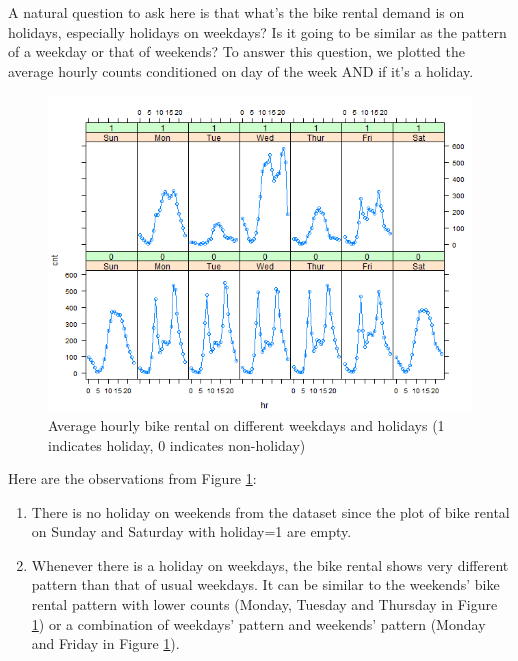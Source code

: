 \documentclass[12pt]{article}
\begin{document}
	A natural question to ask here is that what's the bike rental demand is on holidays, especially holidays on weekdays?  Is it going to be similar as the pattern of a weekday or that of weekends? To answer this question, we plotted the average hourly counts conditioned on day of the week AND if it's a holiday.
		\begin{figure}[H]
			\centering
			\includegraphics[scale=.5]{figures/hr_weekday_holiday.png}
			\caption{Average hourly bike rental on different weekdays and holidays (1 indicates holiday, 0 indicates non-holiday)} 
			\label{fig:weekday_holiday}
		\end{figure}
		
	Here are the observations from Figure \ref{fig:weekday_holiday}:
	\begin{enumerate}
		\item There is no holiday on weekends from the dataset since the plot of bike rental on Sunday and Saturday with holiday=1 are empty.
		\item Whenever there is a holiday on weekdays, the bike rental shows very different pattern than that of usual weekdays. It can be similar to the weekends' bike rental pattern with lower counts (Monday, Tuesday and Thursday in Figure \ref{fig:weekday_holiday}) or a combination of weekdays' pattern and weekends' pattern (Monday and Friday in Figure \ref{fig:weekday_holiday}). 
	\end{enumerate}
	
	
\end{document}
